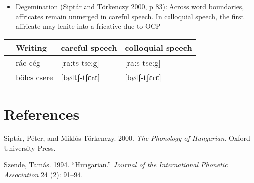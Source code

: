 \documentclass[12pt,]{article}
\providecommand{\tightlist}{%
  \setlength{\itemsep}{0pt}\setlength{\parskip}{0pt}}
\begin{document}
\begin{itemize}
\tightlist
\item
  Degemination (Siptár and Törkenczy 2000, p 83): Across word
  boundaries, affricates remain unmerged in careful speech. In
  colloquial speech, the first affricate may lenite into a fricative due
  to OCP
\end{itemize}

\begin{longtable}[]{@{}llll@{}}
\toprule
& Writing & careful speech & colloquial speech\tabularnewline
\midrule
\endhead
& rác cég & {[}raːts-tseːg{]} & {[}raːs-tseːg{]}\tabularnewline
& bölcs csere & {[}bøltʃ-tʃɛrɛ{]} & {[}bølʃ-tʃɛrɛ{]}\tabularnewline
\bottomrule
\end{longtable}

\hypertarget{references}{%
\section*{References}\label{references}}

\hypertarget{refs}{}
\leavevmode\hypertarget{ref-ST}{}%
Siptár, Péter, and Miklós Törkenczy. 2000. \emph{The Phonology of
Hungarian}. Oxford University Press.

\leavevmode\hypertarget{ref-IPA}{}%
Szende, Tamás. 1994. ``Hungarian.'' \emph{Journal of the International
Phonetic Association} 24 (2): 91--94.
\end{document}

